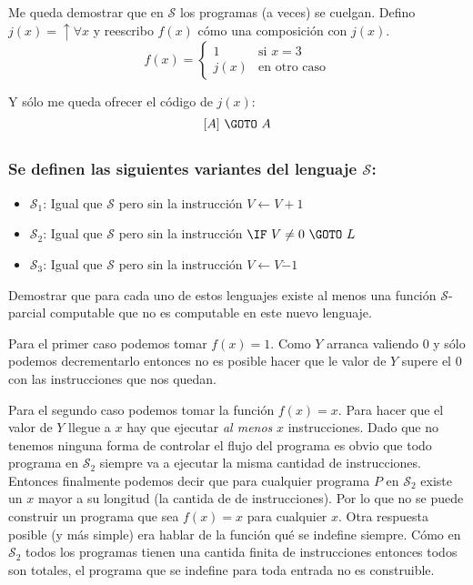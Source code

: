 \documentclass[fleqn, 11pt]{article}
\newcommand{\Scur}{\mathcal{S}}
\newcommand{\indef}{\uparrow}
\newcommand{\into}{\leftarrow}
\begin{document}
Me queda demostrar que en $\Scur$ los programas (a veces) se cuelgan. Defino
$j(x) = \indef \forall x$ y reescribo $f(x)$ cómo una composición con $j(x)$.
\[
	f(x) =
	\begin{cases}
		1    & \text{si } x = 3 \\
		j(x) & \text{en otro caso}
	\end{cases}
\]

Y sólo me queda ofrecer el código de $j(x)$:
\[[A]\ \GOTO\ A\]

\subsection{}

\subsubsection{Se definen las siguientes variantes del lenguaje $\Scur$:}

\begin{itemize}
	\item $\Scur_1$: Igual que $\Scur$ pero sin la instrucción
	$V \into V + 1$
	\item $\Scur_2$: Igual que $\Scur$ pero sin la instrucción
	$\IF\ V \neq 0\ \GOTO\ L$
	\item $\Scur_3$: Igual que $\Scur$ pero sin la instrucción
	$V \into V \dot- 1$
\end{itemize}

Demostrar que para cada uno de estos lenguajes existe al menos una función
$\Scur$-parcial computable que no es computable en este nuevo lenguaje.

Para el primer caso podemos tomar $f(x) = 1$. Como $Y$ arranca valiendo $0$ y
sólo podemos decrementarlo entonces no es posible hacer que le valor de $Y$
supere el $0$ con las instrucciones que nos quedan.

Para el segundo caso podemos tomar la función $f(x) = x$. Para hacer que el
valor de $Y$ llegue a $x$ hay que ejecutar \emph{al menos} $x$ instrucciones.
Dado que no tenemos ninguna forma de controlar el flujo del programa es obvio
que todo programa en $\Scur_2$ siempre va a ejecutar la misma cantidad de
instrucciones. Entonces finalmente podemos decir que para cualquier programa
$P$ en $\Scur_2$ existe un $x$ mayor a su longitud (la cantida de de
instrucciones). Por lo que no se puede construir un programa que sea $f(x) = x$
para cualquier $x$. Otra respuesta posible (y más simple) era hablar de la
función qué se indefine siempre. Cómo en $\Scur_2$ todos los programas tienen
una cantida finita de instrucciones entonces todos son totales, el programa que
se indefine para toda entrada no es construible.
\end{document}
